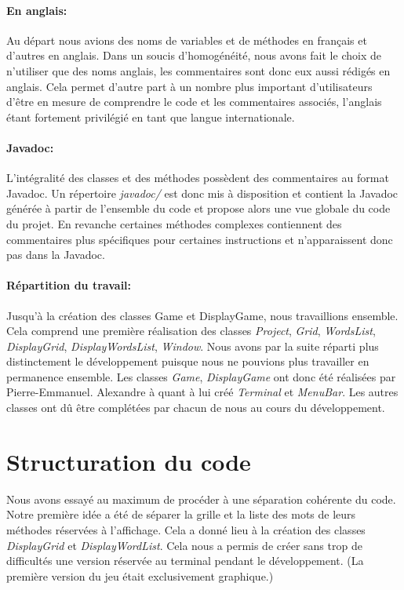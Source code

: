 \documentclass{article}
\begin{document}
\paragraph{En anglais:} Au départ nous avions des noms de variables et de méthodes en français et d'autres en anglais. Dans un soucis d'homogénéité, nous avons fait le choix de n'utiliser que des noms anglais, les commentaires sont donc eux aussi rédigés en anglais. Cela permet d'autre part à un nombre plus important d'utilisateurs d'être en mesure de comprendre le code et les commentaires associés, l'anglais étant fortement privilégié en tant que langue internationale.

\paragraph{Javadoc:} L'intégralité des classes et des méthodes possèdent des commentaires au format Javadoc. Un répertoire \textit{javadoc/} est donc mis à disposition et contient la Javadoc générée à partir de l'ensemble du code et propose alors une vue globale du code du projet. En revanche certaines méthodes complexes contiennent des commentaires plus spécifiques pour certaines instructions et n'apparaissent donc pas dans la Javadoc.

\paragraph{Répartition du travail:} Jusqu'à la création des classes Game et DisplayGame, nous travaillions ensemble. Cela comprend une première réalisation des classes \textit{Project}, \textit{Grid}, \textit{WordsList}, \textit{DisplayGrid}, \textit{DisplayWordsList}, \textit{Window}. Nous avons par la suite réparti plus distinctement le développement puisque nous ne pouvions plus travailler en permanence ensemble. Les classes \textit{Game}, \textit{DisplayGame} ont donc été réalisées par Pierre-Emmanuel. Alexandre à quant à lui créé \textit{Terminal} et \textit{MenuBar}. Les autres classes ont dû être complétées par chacun de nous au cours du développement.



\section{Structuration du code}

Nous avons essayé au maximum de procéder à une séparation cohérente du code. Notre première idée a été de séparer la grille et la liste des mots de leurs méthodes réservées à l'affichage. Cela a donné lieu à la création des classes \textit{DisplayGrid} et \textit{DisplayWordList}.
Cela nous a permis de créer sans trop de difficultés une version réservée au terminal pendant le développement. (La première version du jeu était exclusivement graphique.)
\end{document}
